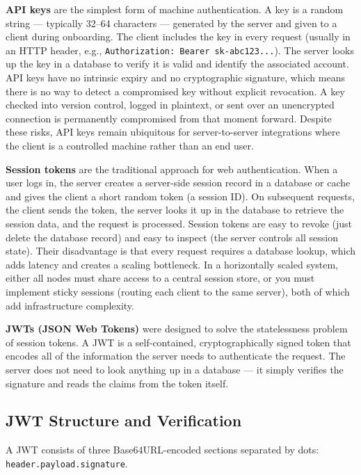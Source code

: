 \documentclass[11pt,a4paper]{article}
\begin{document}
\textbf{API keys} are the simplest form of machine authentication. A key is a random string --- typically 32--64 characters --- generated by the server and given to a client during onboarding. The client includes the key in every request (usually in an HTTP header, e.g., \texttt{Authorization: Bearer sk-abc123...}). The server looks up the key in a database to verify it is valid and identify the associated account. API keys have no intrinsic expiry and no cryptographic signature, which means there is no way to detect a compromised key without explicit revocation. A key checked into version control, logged in plaintext, or sent over an unencrypted connection is permanently compromised from that moment forward. Despite these risks, API keys remain ubiquitous for server-to-server integrations where the client is a controlled machine rather than an end user.

\textbf{Session tokens} are the traditional approach for web authentication. When a user logs in, the server creates a server-side session record in a database or cache and gives the client a short random token (a session ID). On subsequent requests, the client sends the token, the server looks it up in the database to retrieve the session data, and the request is processed. Session tokens are easy to revoke (just delete the database record) and easy to inspect (the server controls all session state). Their disadvantage is that every request requires a database lookup, which adds latency and creates a scaling bottleneck. In a horizontally scaled system, either all nodes must share access to a central session store, or you must implement sticky sessions (routing each client to the same server), both of which add infrastructure complexity.

\textbf{JWTs (JSON Web Tokens)} were designed to solve the statelessness problem of session tokens. A JWT is a self-contained, cryptographically signed token that encodes all of the information the server needs to authenticate the request. The server does not need to look anything up in a database --- it simply verifies the signature and reads the claims from the token itself.

\subsection{JWT Structure and Verification}

A JWT consists of three Base64URL-encoded sections separated by dots: \texttt{header.payload.signature}.
\end{document}
